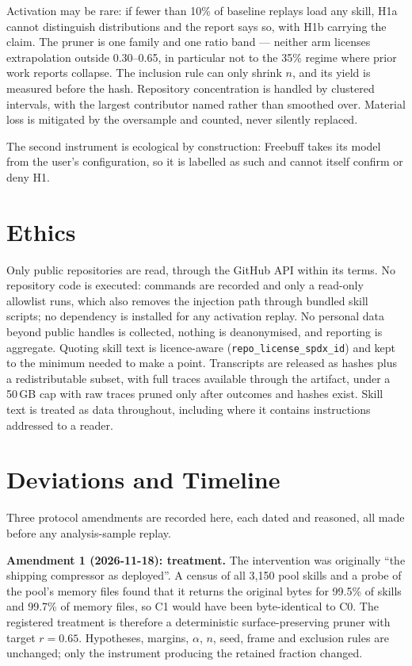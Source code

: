 \documentclass[10pt,conference]{IEEEtran}
\begin{document}
Activation may be rare: if fewer than 10\% of baseline replays load any skill, H1a cannot distinguish distributions and the report says so, with H1b carrying the claim. The pruner is one family and one ratio band --- neither arm licenses extrapolation outside 0.30--0.65, in particular not to the 35\% regime where prior work reports collapse. The inclusion rule can only shrink $n$, and its yield is measured before the hash. Repository concentration is handled by clustered intervals, with the largest contributor named rather than smoothed over. Material loss is mitigated by the oversample and counted, never silently replaced.

The second instrument is ecological by construction: Freebuff takes its model from the user's configuration, so it is labelled as such and cannot itself confirm or deny H1.

\section{Ethics}
Only public repositories are read, through the GitHub API within its terms. No repository code is executed: commands are recorded and only a read-only allowlist runs, which also removes the injection path through bundled skill scripts; no dependency is installed for any activation replay. No personal data beyond public handles is collected, nothing is deanonymised, and reporting is aggregate. Quoting skill text is licence-aware (\texttt{repo\_license\_spdx\_id}) and kept to the minimum needed to make a point. Transcripts are released as hashes plus a redistributable subset, with full traces available through the artifact, under a 50\,GB cap with raw traces pruned only after outcomes and hashes exist. Skill text is treated as data throughout, including where it contains instructions addressed to a reader.

\section{Deviations and Timeline}
\label{sec:deviation}
Three protocol amendments are recorded here, each dated and reasoned, all made before any analysis-sample replay.

\textbf{Amendment 1 (2026-11-18): treatment.} The intervention was originally ``the shipping compressor as deployed''. A census of all 3{,}150 pool skills and a probe of the pool's memory files found that it returns the original bytes for 99.5\% of skills and 99.7\% of memory files, so C1 would have been byte-identical to C0. The registered treatment is therefore a deterministic surface-preserving pruner with target $r=0.65$. Hypotheses, margins, $\alpha$, $n$, seed, frame and exclusion rules are unchanged; only the instrument producing the retained fraction changed.
\end{document}
